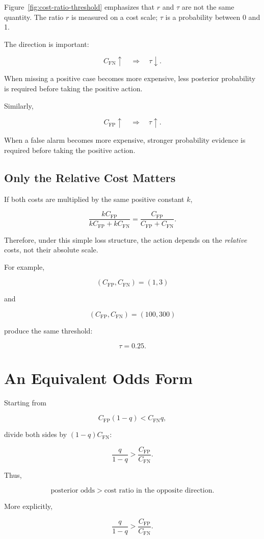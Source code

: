 \documentclass[11pt]{article}
\newcommand{\CFP}{C_{\mathrm{FP}}}
\newcommand{\CFN}{C_{\mathrm{FN}}}
\begin{document}
Figure~\ref{fig:cost-ratio-threshold} emphasizes that $r$ and $\tau$ are not the same quantity. The ratio $r$ is measured on a cost scale; $\tau$ is a probability between 0 and 1.

The direction is important:

\[
\CFN\uparrow
\quad\Longrightarrow\quad
\tau\downarrow.
\]

When missing a positive case becomes more expensive, less posterior probability is required before taking the positive action.

Similarly,

\[
\CFP\uparrow
\quad\Longrightarrow\quad
\tau\uparrow.
\]

When a false alarm becomes more expensive, stronger probability evidence is required before taking the positive action.

\subsection{Only the Relative Cost Matters}

If both costs are multiplied by the same positive constant $k$,

\[
\frac{k\CFP}{k\CFP+k\CFN}
=
\frac{\CFP}{\CFP+\CFN}.
\]

Therefore, under this simple loss structure, the action depends on the \emph{relative} costs, not their absolute scale.

For example,

\[
(\CFP,\CFN)=(1,3)
\]

and

\[
(\CFP,\CFN)=(100,300)
\]

produce the same threshold:

\[
\tau=0.25.
\]

\section{An Equivalent Odds Form}

Starting from

\[
\CFP(1-q)<\CFN q,
\]

divide both sides by $(1-q)\CFN$:

\[
\frac{q}{1-q}
>
\frac{\CFP}{\CFN}.
\]

Thus,

\[
\boxed{
\text{posterior odds}
>
\text{cost ratio in the opposite direction}.
}
\]

More explicitly,

\[
\boxed{
\frac{q}{1-q}
>
\frac{\CFP}{\CFN}.
}
\]
\end{document}
